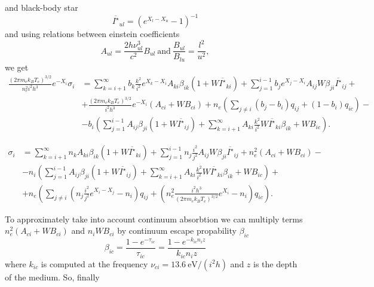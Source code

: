 \documentclass{article}
\begin{document}
and black-body star
\[
\overline{I^\star}_{ul} = \left(e^{X_l - X_u} - 1\right)^{-1}
\]
and using relations between einstein coefficients
\[
A_{ul} = \frac{2h\nu_{ul}^3}{c^2}B_{ul}\ \mathrm{and}\ \frac{B_{ul}}{B_{lu}} = \frac{l^2}{u^2},
\]
we get
\begin{equation}\label{eq:sources-bi}
    \begin{aligned}
        \frac{(2\pi m_ek_BT_e)^{3/2}}{n_e^2i^2h^3}e^{-X_i}\sigma_i &= \sum\limits_{k=i+1}^\infty b_k\frac{k^2}{i^2}e^{X_k-X_i}A_{ki}\beta_{ik}(1 + W\overline{I^\star}_{ki}) + \sum\limits_{j=1}^{i-1} b_je^{X_j-X_i}A_{ij}W\beta_{ji} \overline{I^\star}_{ij} +\\
        &+\frac{(2\pi m_ek_BT_e)^{3/2}}{i^2h^3}e^{-X_i}(A_{ci} + WB_{ci}) +n_e\left(\sum\limits_{j \neq i}(b_j-b_i)q_{ij}  + (1-b_i)q_{ic}\right)-\\
        &-b_i\left(\sum\limits_{j=1}^{i-1}A_{ij}\beta_{ji}(1 + W\overline{I^\star}_{ij}) + \sum\limits_{k=i+1}^\infty A_{ki}\frac{k^2}{i^2}W\overline{I^\star}_{ki}\beta_{ik}  + WB_{ic}\right).
    \end{aligned}
\end{equation}

\begin{equation}
    \begin{aligned}
        \sigma_i &= \sum\limits_{k=i+1}^\infty n_kA_{ki}\beta_{ik}(1 + W\overline{I^\star}_{ki}) + \sum\limits_{j=1}^{i-1} n_j\frac{i^2}{j^2}A_{ij}W\beta_{ji} \overline{I^\star}_{ij} +n_e^2(A_{ci} + WB_{ci}) -\\
        &-n_i\left(\sum\limits_{j=1}^{i-1}A_{ij}\beta_{ji}(1 + W\overline{I^\star}_{ij}) + \sum\limits_{k=i+1}^\infty A_{ki}\frac{k^2}{i^2}W\overline{I^\star}_{ki}\beta_{ik}  + WB_{ic}\right) +\\
        &+n_e\left(\sum\limits_{j \neq i}\left(n_j\frac{i^2}{j^2}e^{X_i-X_j}-n_i\right)q_{ij}  + \left(n_e^2\frac{i^2h^3}{(2\pi m_ek_BT_e)^{3/2}}e^{X_i}-n_i\right)q_{ic}\right). 
    \end{aligned}
\end{equation}

To approximately take into account continuum absorbtion we can multiply terms \(n_e^2(A_{ci} + WB_{ci})\) and \(n_iWB_{ci}\) by continuum escape propability \(\beta_{ic}\)
\[
    \beta_{ic} = \frac{1 - e^{-\tau_{ic}}}{\tau_{ic}} = \frac{1 - e^{-k_{ic}n_iz}}{k_{ic}n_iz} 
\] 
where \(k_{ic}\) is computed at the frequency \(\nu_{ci} = 13.6\ \mathrm{eV}/(i^2h)\) and \(z\) is the depth of the medium. So, finally
\end{document}
